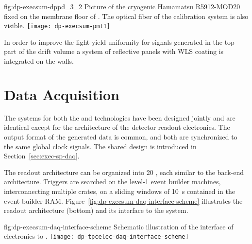 \begin{dunefigure}{fig:dp-execsum-dppd_3_2}
{Picture of the cryogenic Hamamatsu R5912-MOD20  fixed on the membrane floor of . The optical fiber of the calibration system is also visible.}
\texttt{[image: dp-execsum-pmt1]}
\end{dunefigure}

In order to improve the light yield uniformity for signals generated in the top part of the drift volume a system of reflective panels with WLS coating is integrated on the   walls.


\section{Data Acquisition}
\label{sec:dp-execsum-daq}

The  systems for both the  and  technologies have been designed jointly and are identical except for the architecture of the detector readout electronics.  The output format of the generated data is common, and both are synchronized to the same global clock signals. The shared  design is introduced in Section~\ref{sec:exec-sp-daq}.

The  readout architecture can be organized into \num{20} , each similar to the  back-end architecture. Triggers are searched on the level-1 event builder machines, interconnecting multiple  crates, on a sliding windows of \SI{10}{s}  contained in the event builder RAM.
Figure~\ref{fig:dp-execsum-daq-interface-scheme} illustrates the  readout architecture (bottom) and its interface to the  system.
  

\begin{dunefigure}{fig:dp-execsum-daq-interface-scheme}
{Schematic illustration of the interface of   electronics to .}
\texttt{[image: dp-tpcelec-daq-interface-scheme]}
\end{dunefigure}

